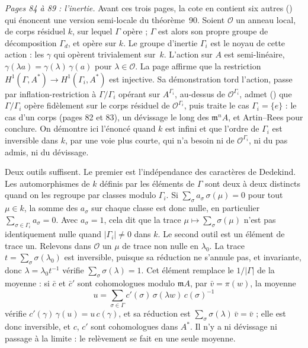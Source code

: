 \noindent\emph{Pages 84 à 89 : l'inertie.} Avant ces trois pages, la cote en contient six autres () qui énoncent une version semi-locale du théorème~90. Soient $\mathcal O$ un anneau local, de corps résiduel $k$, sur lequel $\Gamma$ opère ; $\Gamma$ est alors son propre groupe de décomposition $\Gamma_d$, et opère sur $k$. Le groupe d'inertie $\Gamma_i$ est le noyau de cette action : les $\gamma$ qui opèrent trivialement sur~$k$. L'action sur $A$ est semi-linéaire, $\gamma(\lambda a) = \gamma(\lambda)\,\gamma(a)$ pour $\lambda \in \mathcal O$. La page affirme que la restriction $H^1(\Gamma, A^*) \to H^1(\Gamma_i, A^*)$ est injective. Sa démonstration tord l'action, passe par inflation-restriction à $\Gamma/\Gamma_i$ opérant sur $A^{\Gamma_i}$, au-dessus de $\mathcal O^{\Gamma_i}$, admet () que $\Gamma/\Gamma_i$ opère fidèlement sur le corps résiduel de $\mathcal O^{\Gamma_i}$, puis traite le cas $\Gamma_i = \{e\}$ : le cas d'un corps (pages 82 et 83), un dévissage le long des $\mathfrak m^nA$, et Artin--Rees pour conclure. On démontre ici l'énoncé quand $k$ est infini et que l'ordre de $\Gamma_i$ est inversible dans $k$, par une voie plus courte, qui n'a besoin ni de $\mathcal O^{\Gamma_i}$, ni du pas admis, ni du dévissage.

Deux outils suffisent. Le premier est l'indépendance des caractères de Dedekind. Les automorphismes de $k$ définis par les éléments de $\Gamma$ sont deux à deux distincts quand on les regroupe par classes modulo $\Gamma_i$. Si $\sum_\sigma a_\sigma\,\sigma(\mu) = 0$ pour tout $\mu \in k$, la somme des $a_\sigma$ sur chaque classe est donc nulle, en particulier $\sum_{\sigma \in \Gamma_i} a_\sigma = 0$. Avec $a_\sigma = 1$, cela dit que la trace $\mu \mapsto \sum_\sigma \sigma(\mu)$ n'est pas identiquement nulle quand $|\Gamma_i| \neq 0$ dans $k$. Le second outil est un élément de trace un. Relevons dans $\mathcal O$ un $\mu$ de trace non nulle en $\lambda_0$. La trace $t = \sum_\sigma \sigma(\lambda_0)$ est inversible, puisque sa réduction ne s'annule pas, et invariante, donc $\lambda = \lambda_0 t^{-1}$ vérifie $\sum_\sigma \sigma(\lambda) = 1$. Cet élément remplace le $1/|\Gamma|$ de la moyenne : si $\bar c$ et $\bar c'$ sont cohomologues modulo $\mathfrak mA$, par $\bar v = \pi(w)$, la moyenne
\[
u = \sum_{\sigma \in \Gamma} c'(\sigma)\,\sigma(\lambda w)\,c(\sigma)^{-1}
\]
vérifie $c'(\gamma)\,\gamma(u) = u\,c(\gamma)$, et sa réduction est $\sum_\sigma \sigma(\lambda)\,\bar v = \bar v$ ; elle est donc inversible, et $c$, $c'$ sont cohomologues dans $A^*$. Il n'y a ni dévissage ni passage à la limite : le relèvement se fait en une seule moyenne.

